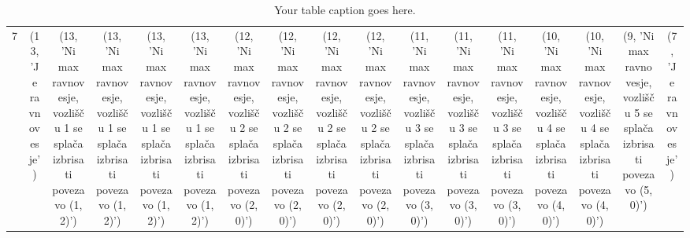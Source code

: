 \documentclass[fin1, tisk]{fmfdelo}
\begin{document}
\begin{table}[h]
{\begin{tabular}{|c|*{16}{c|}}
            7 & (13, 'Je ravnovesje') & (13, 'Ni max ravnovesje, vozlišču 1 se splača izbrisati povezavo (1, 2)') & (13, 'Ni max ravnovesje, vozlišču 1 se splača izbrisati povezavo (1, 2)') & (13, 'Ni max ravnovesje, vozlišču 1 se splača izbrisati povezavo (1, 2)') & (13, 'Ni max ravnovesje, vozlišču 1 se splača izbrisati povezavo (1, 2)') & (12, 'Ni max ravnovesje, vozlišču 2 se splača izbrisati povezavo (2, 0)') & (12, 'Ni max ravnovesje, vozlišču 2 se splača izbrisati povezavo (2, 0)') & (12, 'Ni max ravnovesje, vozlišču 2 se splača izbrisati povezavo (2, 0)') & (12, 'Ni max ravnovesje, vozlišču 2 se splača izbrisati povezavo (2, 0)') & (11, 'Ni max ravnovesje, vozlišču 3 se splača izbrisati povezavo (3, 0)') & (11, 'Ni max ravnovesje, vozlišču 3 se splača izbrisati povezavo (3, 0)') & (11, 'Ni max ravnovesje, vozlišču 3 se splača izbrisati povezavo (3, 0)') & (10, 'Ni max ravnovesje, vozlišču 4 se splača izbrisati povezavo (4, 0)') & (10, 'Ni max ravnovesje, vozlišču 4 se splača izbrisati povezavo (4, 0)') & (9, 'Ni max ravnovesje, vozlišču 5 se splača izbrisati povezavo (5, 0)') & (7, 'Je ravnovesje') 
        \hline
        \end{tabular}
    }
    \caption{Your table caption goes here.}
    \label{tab:tabela1}
\end{table}

\\
\end{document}
